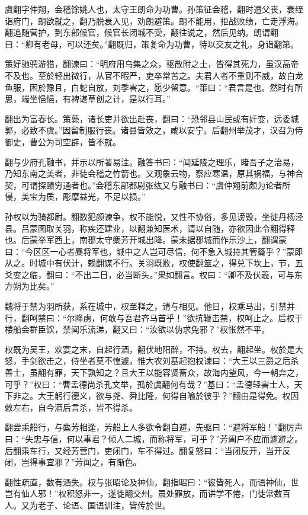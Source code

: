 \documentclass[12pt,UTF8]{ctexbook}
\begin{document}
虞翻字仲翔，会稽馀姚人也，太守王朗命为功曹。孙策征会稽，翻时遭父丧，衰绖诣府门，朗欲就之，翻乃脱衰入见，劝朗避策。朗不能用，拒战败绩，亡走浮海。翻追随营护，到东部候官，候官长闭城不受，翻往说之，然后见纳。朗谓翻曰：“卿有老母，可以还矣。”翻既归，策复命为功曹，待以交友之礼，身诣翻第。

策好驰骋游猎，翻谏曰：“明府用乌集之众，驱散附之士，皆得其死力，虽汉高帝不及也。至於轻出微行，从官不暇严，吏卒常苦之。夫君人者不重则不威，故白龙鱼服，困於豫且，白蛇自放，刘季害之，愿少留意。“策曰：“君言是也。然时有所思，端坐悒悒，有裨谌草创之计，是以行耳。”

翻出为富春长。策薨，诸长吏并欲出赴丧，翻曰：“恐邻县山民或有奸变，远委城郭，必致不虞。”因留制服行丧。诸县皆效之，咸以安宁。后翻州举茂才，汉召为侍御史，曹公为司空辟，皆不就。

翻与少府孔融书，并示以所著易注。融答书曰：“闻延陵之理乐，睹吾子之治易，乃知东南之美者，非徒会稽之竹箭也。又观象云物，察应寒温，原其祸福，与神合契，可谓探赜穷通者也。”会稽东部都尉张纮又与融书曰：“虞仲翔前颇为论者所侵，美宝为质，彫摩益光，不足以损。”

孙权以为骑都尉。翻数犯颜谏争，权不能悦，又性不协俗，多见谤毁，坐徙丹杨泾县。吕蒙图取关羽，称疾还建业，以翻兼知医术，请以自随，亦欲因此令翻得释也。后蒙举军西上，南郡太守麋芳开城出降。蒙未据郡城而作乐沙上，翻谓蒙曰：“今区区一心者麋将军也，城中之人岂可尽信，何不急入城持其管籥乎？”蒙即从之。时城中有伏计，赖翻谋不行。关羽既败，权使翻筮之，得兑下坎上，节，五爻变之临，翻曰：“不出二日，必当断头。”果如翻言。权曰：“卿不及伏羲，可与东方朔为比矣。”

魏将于禁为羽所获，系在城中，权至释之，请与相见。他日，权乘马出，引禁并行，翻呵禁曰：“尔降虏，何敢与吾君齐马首乎！”欲抗鞭击禁，权呵止之。后权于楼船会群臣饮，禁闻乐流涕，翻又曰：“汝欲以伪求免邪？”权怅然不平。

权既为吴王，欢宴之末，自起行酒，翻伏地阳醉，不持。权去，翻起坐。权於是大怒，手剑欲击之，侍坐者莫不惶遽，惟大农刘基起抱权谏曰：“大王以三爵之后杀善士，虽翻有罪，天下孰知之？且大王以能容贤畜众，故海内望风，今一朝弃之，可乎？”权曰：“曹孟德尚杀孔文举，孤於虞翻何有哉？”基曰：“孟德轻害士人，天下非之。大王躬行德义，欲与尧、舜比隆，何得自喻於彼乎？”翻由是得免。权因敕左右，自今酒后言杀，皆不得杀。

翻尝乘船行，与麋芳相逢，芳船上人多欲令翻自避，先驱曰：“避将军船！”翻厉声曰：“失忠与信，何以事君？倾人二城，而称将军，可乎？”芳阖户不应而遽避之。后翻乘车行，又经芳营门，吏闭门，车不得过。翻复怒曰：“当闭反开，当开反闭，岂得事宜邪？”芳闻之，有惭色。

翻性疏直，数有酒失。权与张昭论及神仙，翻指昭曰：“彼皆死人，而语神仙，世岂有仙人邪！”权积怒非一，遂徙翻交州。虽处罪放，而讲学不倦，门徒常数百人。又为老子、论语、国语训注，皆传於世。
\end{document}
